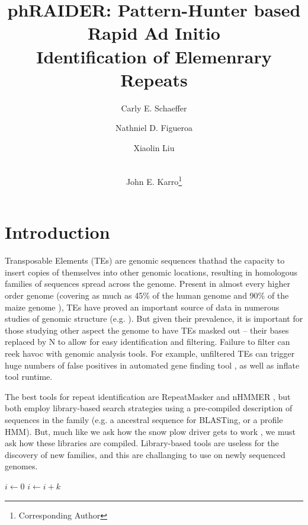 \documentclass[10pt]{article}
\title{phRAIDER: Pattern-Hunter based Rapid Ad Initio \\ Identification of Elemenrary Repeats}
\author[1]{Carly E. Schaeffer}
\author[1]{Nathniel D. Figueroa}
\author[2]{Xiaolin Liu}
\author[1,2,3,4]{\\John E. Karro\thanks{Corresponding Author}}
\affil[1]{Department of Computer Science and Software Engineering}
\affil[2]{Cell, Molecular, and Structural Bology}
\affil[3]{Department of Microbiology}
\affil[4]{Department of Statisticcs, Miami University, Oxford, Ohio (USA)}
\date{}
\begin{document}
\maketitle
{}

\section*{Introduction}

Transposable Elements (TEs) are genomic sequences thathad the capacity
to insert copies of themselves into other genomic locations, resulting
in homologous families of sequences spread across the genome.  Present
in almost every higher order genome (covering as much as 45\% of the
human genome and 90\% of the maize genome
\cite{Venter:2001p92,SanMiguel:1996wa}), TEs have proved an important
source of data in numerous studies of genomic structure (e.g.
\cite{Arndt:2005p279,Karro:2008p123,Mugal:2009p581,Hardison:2003p97}).
But given their prevalence, it is important for those studying other
aspect the genome to have TEs masked out -- their bases replaced by N
to allow for easy identification and filtering.  Failure to filter can
reek havoc with genomic analysis tools.  For example, unfiltered TEs can trigger
huge numbers of false positives in automated gene finding tool
\cite{Jiang:2013jt}, as well as inflate tool runtime.

The best tools for repeat identification are RepeatMasker and nHMMER
\cite{RepeatMaskerOpen:XkNxXSd7,Wheeler:2013gj}, but both employ 
library-based search strategies using a pre-compiled
description of sequences in the family (e.g. a ancestral sequence for
BLASTing, or a profile HMM).  But, much like we ask how
the snow plow driver gets to work \cite{Pratchett:uw}, we must ask how
these libraries are compiled.  Library-based tools
are useless for the discovery of new families, and this are
challanging to use on newly sequenced genomes.

\begin{algorithmic}
    \State $i\gets 0$
\Else
        \State $i\gets i+k$
    \EndIf
\EndIf
\end{algorithmic}


\end{document}
